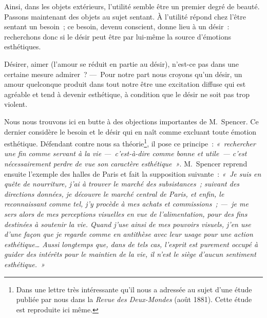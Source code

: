 \documentclass[french,twoside]{book} %
\begin{document}
Ainsi, dans les objets extérieurs, l’utilité semble être un premier degré de beauté. Passons maintenant des objets au sujet sentant. À l’utilité répond chez l’être sentant un besoin ; ce besoin, devenu conscient, donne lieu à un désir : recherchons donc si le désir peut être par lui-même la source d’émotions esthétiques.\par
\par
Désirer, aimer (l’amour se réduit en partie au désir), n’est-ce pas dans une certaine mesure admirer ? — Pour notre part nous croyons qu’un désir, un amour quelconque produit dans tout notre être une excitation diffuse qui est  agréable et tend à devenir esthétique, à condition que le désir ne soit pas trop violent.\par
Nous nous trouvons ici en butte à des objections importantes de M. Spencer. Ce dernier considère le besoin et le désir qui en naît comme excluant toute émotion esthétique. Défendant contre nous sa théorie\footnote{Dans une lettre très intéressante qu’il nous a adressée au sujet d’une étude publiée par nous dans la \emph{Revue des Deux-Mondes} (août 1881). Cette étude est reproduite ici même.}, il pose ce principe : \emph{« rechercher une fin comme servant à la vie — c’est-à-dire comme \emph{bonne} et \emph{utile} — c’est nécessairement perdre de vue son caractère \emph{esthétique} »}. M. Spencer reprend ensuite l’exemple des halles de Paris et fait la supposition suivante : \emph{« Je suis en quête de nourriture, j’ai à trouver le marché des subsistances ; suivant des directions données, je découvre le marché central de Paris, et enfin, le reconnaissant comme tel, j’y procède à mes achats et commissions ; — je me sers alors de mes perceptions visuelles en vue de l’alimentation, pour des fins destinées à soutenir la vie. Quand j’use ainsi de mes pouvoirs visuels, j’en use d’une façon que je regarde comme en antithèse \emph{avec leur usage pour une action esthétique}… Aussi longtemps que, dans de tels cas, l’esprit est purement occupé à guider des intérêts pour le maintien de la vie, il n’est le siège d’aucun sentiment esthétique. »}\par
\end{document}
